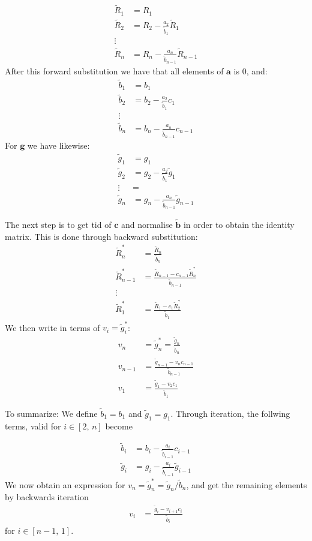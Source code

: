 \documentclass[english,notitlepage,nofootinbib]{revtex4-1}  %
\renewcommand{\vec}{\mathbf}
\begin{document}
\begin{align*}
    \tilde{R}_1 &= R_1 \\
    \tilde{R}_2 &= R_2 - \frac{a_2}{\tilde{b}_1}\tilde{R}_1\\
    \vdots & \\
    \tilde{R}_n &= R_n - \frac{a_n}{\tilde{b}_{n-1}}\tilde{R}_{n-1}
\end{align*}
After this forward substitution we have that all elements of $\vec{a}$ is 0, and:
\begin{align*}
    \tilde{b}_1 &= b_1 \\
    \tilde{b}_2 &= b_2 - \frac{a_2}{\tilde{b}_1} c_1 \\
    \vdots & \\
    \tilde{b}_n &= b_n - \frac{a_n}{\tilde{b}_{n-1}} c_{n-1}
\end{align*}
For $\vec{g}$ we have likewise:
\begin{align*}
    \tilde{g}_1 &= g_1 \\
    \tilde{g}_2 &= g_2 -  \frac{a_2}{\tilde{b}_1}\tilde{g}_1 \\
    \vdots &= \\
    \tilde{g}_n &= g_n - \frac{a_n}{\tilde{b}_{n-1}}\tilde{g}_{n-1}
\end{align*}

The next step is to get tid of $\vec{ c}$ and normalise $\vec{\tilde{b}}$ in order to obtain the identity matrix. This is done through backward substitution:
\begin{align*} 
    \tilde{R}^*_n &= \frac{\tilde{R}_n}{\tilde{b}_n} \\
    \tilde{R}^*_{n-1} &= \frac{\tilde{R}_{n-1} -  c_{n-1}\tilde{R}^*_n}{\tilde{b}_{n-1}} \\
    \vdots & \\
    \tilde{R}^*_1 &= \frac{\tilde{R}_{1} -  c_{1}\tilde{R}^*_2}{\tilde{b}_{1}}
\end{align*}
We then write in terms of $v_i = \tilde{g}^*_i$:
\begin{align*}
    v_n &= \tilde{g}^*_n = \frac{\tilde{g}_n}{\tilde{b}_n} \\
    v_{n-1} &= \frac{\tilde{g}_{n-1}- v_n c_{n-1}}{\tilde{b}_{n-1}}\\
    v_1 &= \frac{\tilde{g}_1 - v_2 c_1}{\tilde{b}_1}
\end{align*}


To summarize: We define $\tilde{b}_1 = b_1$ and $\tilde{g}_1 = g_1$. Through iteration, the follwing terms, valid for $i\in[2,\,n]$ become 

\begin{align*}
    \tilde{b}_i &= b_i - \frac{a_i}{\tilde{b}_{i-1}} c_{i-1} \\
    \tilde{g}_i &= g_i - \frac{a_i}{\tilde{b}_{i-1}}\tilde{g}_{i-1} 
\end{align*}
We now obtain an expression for $v_n=\tilde{g}^*_n = \tilde{g}_n/\tilde{b}_n$, and get the remaining elements by backwards iteration  
\begin{align*}
    v_{i} &= \frac{\tilde{g}_{i}- v_{i+1} c_{i}}{\tilde{b}_{i}} 
\end{align*}
for $i\in[n-1,\,1]$. 
\end{document}
